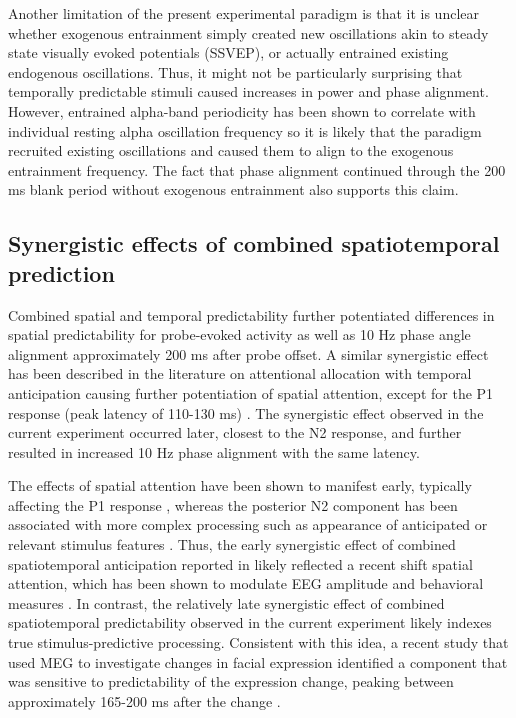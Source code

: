 \documentclass[dwyatte_dissertation.tex]{subfiles}
\begin{document}
Another limitation of the present experimental paradigm is that it is unclear whether exogenous entrainment simply created new oscillations akin to steady state visually evoked potentials (SSVEP), or actually entrained existing endogenous oscillations. Thus, it might not be particularly surprising that temporally predictable stimuli caused increases in power and phase alignment. However, entrained alpha-band periodicity has been shown to correlate with individual resting alpha oscillation frequency  so it is likely that the paradigm recruited existing oscillations and caused them to align to the exogenous entrainment frequency. The fact that phase alignment continued through the 200 ms blank period without exogenous entrainment also supports this claim.

\subsection{Synergistic effects of combined spatiotemporal prediction}
Combined spatial and temporal predictability further potentiated differences in spatial predictability for probe-evoked activity as well as 10 Hz phase angle alignment approximately 200 ms after probe offset. A similar synergistic effect has been described in the literature on attentional allocation with temporal anticipation causing further potentiation of spatial attention, except for the P1 response (peak latency of 110-130 ms) \cite{DohertyRaoMesulamEtAl05}. The synergistic effect observed in the current experiment occurred later, closest to the N2 response, and further resulted in increased 10 Hz phase alignment with the same latency. 

The effects of spatial attention have been shown to manifest early, typically affecting the P1 response \cite{LuckHeinzeMangunEtAl90,HillyardAnllo-Vento98,HillyardVogelLuck98}, whereas the posterior N2 component has been associated with more complex processing such as appearance of anticipated or relevant stimulus features \cite{FolsteinVanPetten08}. Thus, the early synergistic effect of combined spatiotemporal anticipation reported in  likely reflected a recent shift spatial attention, which has been shown to modulate EEG amplitude and behavioral measures \cite{BuschVanRullen10}. In contrast, the relatively late synergistic effect of combined spatiotemporal predictability observed in the current experiment likely indexes true stimulus-predictive processing. Consistent with this idea, a recent study that used MEG to investigate changes in facial expression identified a component that was sensitive to predictability of the expression change, peaking between approximately 165-200 ms after the change .
\end{document}
